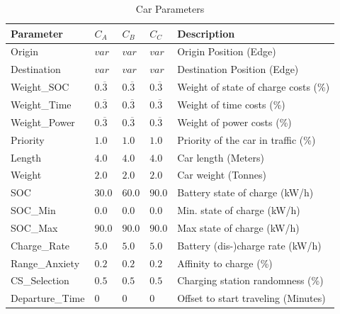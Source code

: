 \begin{table}[h]
	\renewcommand{\arraystretch}{1.3}
	\caption{Car Parameters}
	\centering
	\begin{tabular}{lllll}
		\hline
		\textbf{Parameter}          & \textbf{$C_{A}$} & \textbf{$C_{B}$}  & \textbf{$C_{C}$}           & \textbf{Description} \\ \hline
		Origin                      & $var$     & $var$ & $var$    & Origin Position (Edge)      \\
		Destination                 & $var$    & $var$  & $var$     & Destination Position (Edge) \\
		Weight\_SOC              & $0.\overline{3}$  & $0.\overline{3}$ & $0.\overline{3}$ & Weight of state of charge costs (\%)                   \\
		Weight\_Time              & $0.\overline{3}$ & $0.\overline{3}$ & $0.\overline{3}$ & Weight of time costs (\%)                     \\
		Weight\_Power             & $0.\overline{3}$ & $0.\overline{3}$ & $0.\overline{3}$ & Weight of power costs (\%)                      \\
		Priority                  & $1.0$ & $1.0$ & $1.0$ & Priority of the car in traffic (\%)                  \\
		Length                    & $4.0$ & $4.0$ & $4.0$ & Car length (Meters)            \\
		Weight                   & $2.0$ & $2.0$ & $2.0$ & Car weight  (Tonnes)                 \\
		SOC                      & $30.0$ & $60.0$ & $90.0$ & Battery state of charge (kW/h)                   \\
		SOC\_Min               & $0.0$ & $0.0$ & $0.0$ & Min. state of charge (kW/h)                     \\
		SOC\_Max              & $90.0$ & $90.0$ & $90.0$ & Max state of charge (kW/h)                      \\
		Charge\_Rate          & $5.0$ & $5.0$ & $5.0$ & Battery (dis-)charge rate (kW/h)                    \\
		Range\_Anxiety         & $0.2$ & $0.2$ & $0.2$ & Affinity to charge (\%)                     \\
		CS\_Selection		   & $0.5$ & $0.5$ & $0.5$ & Charging station randomness (\%)                    \\ 
		Departure\_Time 	& $0$ & $0$ & $0$ & Offset to start traveling (Minutes)                   \\ \hline
	\end{tabular}
\end{table}

